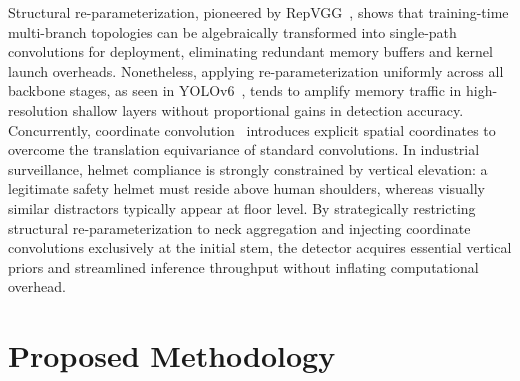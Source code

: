\documentclass[conference]{IEEEtran}
\begin{document}
Structural re-parameterization, pioneered by RepVGG~\cite{ding2021repvgg}, shows that training-time multi-branch topologies can be algebraically transformed into single-path convolutions for deployment, eliminating redundant memory buffers and kernel launch overheads. Nonetheless, applying re-parameterization uniformly across all backbone stages, as seen in YOLOv6~\cite{li2023yolov6}, tends to amplify memory traffic in high-resolution shallow layers without proportional gains in detection accuracy. Concurrently, coordinate convolution~\cite{liu2018coordconv} introduces explicit spatial coordinates to overcome the translation equivariance of standard convolutions. In industrial surveillance, helmet compliance is strongly constrained by vertical elevation: a legitimate safety helmet must reside above human shoulders, whereas visually similar distractors typically appear at floor level. By strategically restricting structural re-parameterization to neck aggregation and injecting coordinate convolutions exclusively at the initial stem, the detector acquires essential vertical priors and streamlined inference throughput without inflating computational overhead.

\section{Proposed Methodology}
\label{sec:method}
\end{document}
